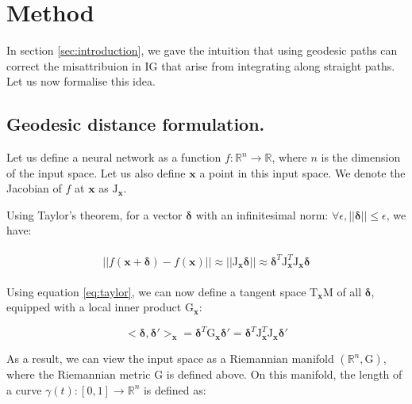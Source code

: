 \section{Method}
\label{sec:method}

In section \ref{sec:introduction}, we gave the intuition that using geodesic paths can correct the misattribuion in IG that arise from integrating along straight paths. Let us now formalise this idea.

\subsection{Geodesic distance formulation.} Let us define a neural network as a function $f: \mathbb{R}^n \to \mathbb{R}$, where $n$ is the dimension of the input space. Let us also define $\textbf{x}$ a point in this input space. We denote the Jacobian of $f$ at $\textbf{x}$ as $\textrm{J}_{\textbf{x}}$.

Using Taylor's theorem, for a vector $\boldsymbol{\delta}$ with an infinitesimal norm: $\forall \epsilon, ||\boldsymbol{\delta}|| \le \epsilon$, we have:

\begin{align}
\begin{split}
    ||f(\textbf{x} + \boldsymbol{\delta}) - f(\textbf{x})|| \approx ||\textrm{J}_{\textbf{x}}\boldsymbol{\delta}|| \approx \boldsymbol{\delta}^T \textrm{J}_{\textbf{x}}^T \textrm{J}_{\textbf{x}} \boldsymbol{\delta}
\end{split}
\label{eq:taylor}
\end{align}

Using equation \ref{eq:taylor}, we can now define a tangent space $\textrm{T}_\textbf{x}\textrm{M}$ of all $\boldsymbol{\delta}$, equipped with a local inner product $\textrm{G}_\textbf{x}$:

\begin{equation}
    <\boldsymbol{\delta}, \boldsymbol{\delta'}>_\textbf{x} = \boldsymbol{\delta}^T \textrm{G}_\textbf{x} \boldsymbol{\delta'}
    = \boldsymbol{\delta}^T \textrm{J}_{\textbf{x}}^T \textrm{J}_{\textbf{x}}\boldsymbol{\delta'}
\label{eq:inner_product}
\end{equation}

As a result, we can view the input space as a Riemannian manifold $(\mathbb{R}^n, \textrm{G})$, where the Riemannian metric $\textrm{G}$ is defined above. On this manifold, the length of a curve $\gamma(t): [0, 1] \to \mathbb{R}^n$ is defined as:

